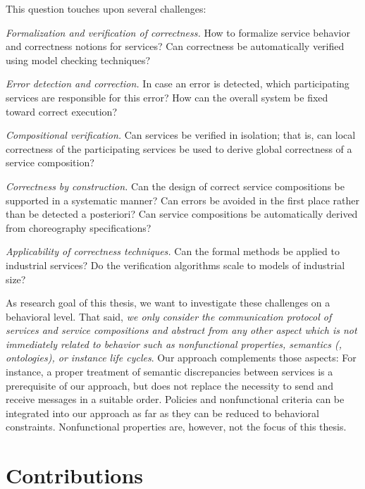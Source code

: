 This question touches upon several challenges:
\begin{niceitemize}
\item \emph{Formalization and verification of correctness.} How to formalize service behavior and correctness notions for services? Can correctness be automatically verified using model checking techniques?
\item \emph{Error detection and correction.} In case an error is detected, which participating services are responsible for this error? How can the overall system be fixed toward correct execution?
\item \emph{Compositional verification.} Can services be verified in isolation; that is, can local correctness of the participating services be used to derive global correctness of a service composition?
\item \emph{Correctness by construction.} Can the design of correct service compositions be supported in a systematic manner? Can errors be avoided in the first place rather than be detected a posteriori? Can service compositions be automatically derived from choreography specifications?
\item \emph{Applicability of correctness techniques.} Can the formal methods be applied to industrial services? Do the verification algorithms scale to models of industrial size?
\end{niceitemize}

As research goal of this thesis, we want to investigate these challenges on a behavioral level. That said, \emph{we only consider the communication protocol of services and service compositions and abstract from any other aspect which is not immediately related to behavior such as nonfunctional properties, semantics (\ie, ontologies), or instance life cycles}. Our approach complements those aspects: For instance, a proper treatment of semantic discrepancies between services is a prerequisite of our approach, but does not replace the necessity to send and receive messages in a suitable order. Policies and nonfunctional criteria can be integrated into our approach as far as they can be reduced to behavioral constraints. Nonfunctional properties are, however, not the focus of this thesis.





\section{Contributions}

